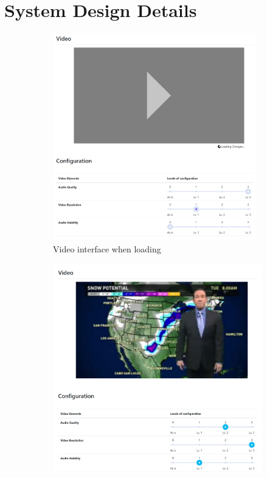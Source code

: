 \section{System Design Details}

\begin{figure}
     \centering
     \begin{subfigure}[ht]{0.49\textwidth}
         \centering
         \vspace*{0.065in}
         \includegraphics[width=0.97\textwidth]{content/image/player_loading.png}
         \caption{Video interface when loading}
         \label{fig:video_loading}
     \end{subfigure}
     \hfill
     \begin{subfigure}[ht]{0.49\textwidth}
         \centering
         \includegraphics[width=\textwidth]{content/image/player.png}

\end{subfigure}
\end{figure}
